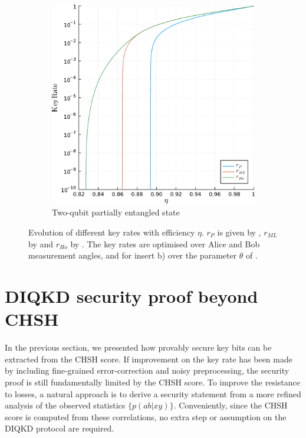 \begin{figure}
\begin{subfigure}[b]{0.72\textwidth}
         \includegraphics[width=\textwidth]{chapters/deviceindependent/img/key_rate_qubit.pdf}
         \caption{Two-qubit partially entangled state}
         \label{fig:kr_qubit}
     \end{subfigure}
	 \caption{Evolution of different key rates with efficiency $\eta$. $r_P$ is given by , $r_{ML}$ by  and $r_{Ho}$ by . The key rates are optimised over Alice and Bob measurement angles, and for insert b) over the parameter $\theta$ of . }
 \end{figure}

\section{DIQKD security proof beyond CHSH}

In the previous section, we presented how provably secure key bits can be extracted from the CHSH score.
If improvement on the key rate has been made by including fine-grained error-correction and noisy preprocessing, the security proof is still fundamentally limited by the CHSH score.
To improve the resistance to losses, a natural approach is to derive a security statement from a more refined analysis of the observed statistics $\{p(ab|xy)\}$.
Conveniently, since the CHSH score is computed from these correlations, no extra step or assumption on the DIQKD protocol are required. 


